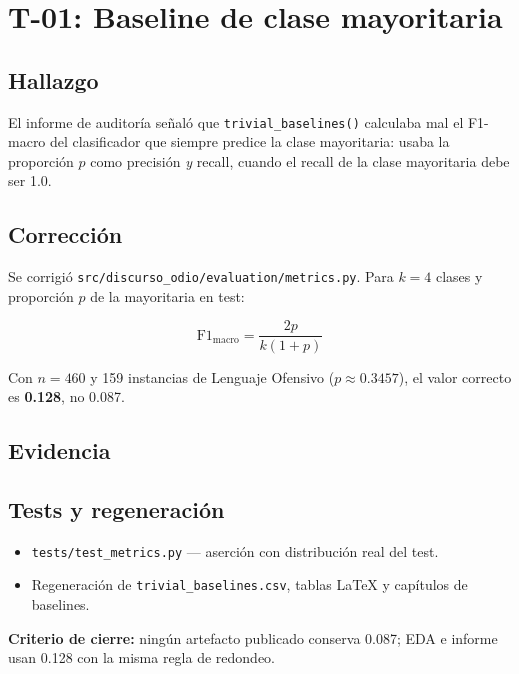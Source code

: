 \chapter{T-01: Baseline de clase mayoritaria}

\section{Hallazgo}

El informe de auditoría señaló que \texttt{trivial\_baselines()} calculaba mal el F1-macro del clasificador que siempre predice la clase mayoritaria: usaba la proporción $p$ como precisión \emph{y} recall, cuando el recall de la clase mayoritaria debe ser 1.0.

\section{Corrección}

Se corrigió \texttt{src/discurso\_odio/evaluation/metrics.py}. Para $k=4$ clases y proporción $p$ de la mayoritaria en test:

\begin{equation}
  \mathrm{F1}_{\mathrm{macro}} = \frac{2p}{k(1+p)}
\end{equation}

Con $n=460$ y 159 instancias de Lenguaje Ofensivo ($p \approx 0.3457$), el valor correcto es \textbf{0.128}, no 0.087.

\section{Evidencia}

\begin{table}[H]
  \centering
  \caption{Baselines triviales corregidos}
  \label{tab:trivial-baselines}
  
\end{table}

\section{Tests y regeneración}

\begin{itemize}[noitemsep]
  \item \texttt{tests/test\_metrics.py} --- aserción con distribución real del test.
  \item Regeneración de \texttt{trivial\_baselines.csv}, tablas LaTeX y capítulos de baselines.
\end{itemize}

\textbf{Criterio de cierre:} ningún artefacto publicado conserva 0.087; EDA e informe usan 0.128 con la misma regla de redondeo.
